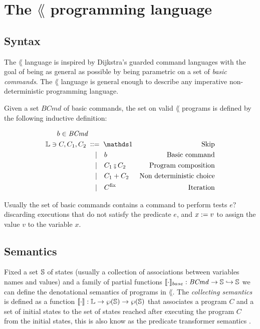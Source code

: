 \documentclass[
  10pt,       %
  twoside,    %
  a4paper,    %
  english,    %
  tikz,       %
  openright,  %
]{book}
\begin{document}
\section{The $\lang$ programming language}

\subsection{Syntax}

The $\lang$ language is inspired by Dijkstra's guarded command languages
\cite{Dijkstra74} with the goal of being as general as possible by being
parametric on a set of \textit{basic commands}. The $\lang$ language is general
enough to describe any imperative non-deterministic programming language.

\begin{definition}
  Given a set $\mathit{BCmd}$ of basic commands, the set on valid $\lang$ programs is 
  defined by the following inductive definition:

  \begin{align*}
    b \in \mathit{BCmd} \\
    \lang \ni C, C_1, C_2 \; & \cceq \sskip        & \text{Skip}\\
                             & \smid b             & \text{Basic command}\\
                             & \smid C_1 \fcmp C_2 & \text{Program composition}\\
                             & \smid C_1 + C_2     & \text{Non deterministic choice}\\
                             & \smid C^\fix        & \text{Iteration}\\
  \end{align*}
\end{definition}

\begin{example} \label{exmp:base-commands-syntax}
  Usually the set of basic commands contains a command to perform tests $e ?$
  discarding executions that do not satisfy the predicate $e$, and $x := v$
  to assign the value $v$ to the variable $x$.
\end{example}

\subsection{Semantics}

Fixed a set $\mathbb{S}$ of states (usually a collection of associations between
variables names and values) and a family of partial functions $\llbracket \cdot \rrbracket_{base} :
\mathit{BCmd} \to \mathbb{S} \hookrightarrow \mathbb{S}$ we can define the denotational semantics
of programs in $\lang$. The \textit{collecting semantics} is defined as a function
$\llbracket \cdot \rrbracket : \mathbb{L} \to \wp(\mathbb{S}) \to \wp(\mathbb{S})$ that associates a
program $C$ and a set of initial states to the set of states reached after
executing the program $C$ from the initial states, this is also know as the
predicate transformer semantics \cite{Dijkstra74}.
\end{document}
